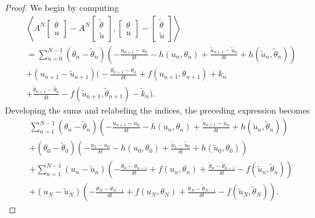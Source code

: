 \documentclass[12pt]{amsart}
\newcommand{\1}{{\chi}}
\newcommand{\lb}{\left(}
\newcommand{\rb}{\right)}
\theoremstyle{definition}
\begin{document}
\begin{proof}
We begin by computing   
\begin{align*}
&\left\langle A^N\left[\begin{array}{c}
\theta\\
u
\end{array}\right]-A^N\left[\begin{array}{c}
\tilde\theta\\
\tilde u
\end{array}\right],\left[\begin{array}{c}
\theta\\
u
\end{array}\right]-\left[\begin{array}{c}
\tilde\theta\\
\tilde u
\end{array}\right]\right\rangle\\
                &=\sum_{n=0}^{N-1} (\theta_n - \tilde \theta_n) \left(-\frac{u_{n+1}- u_{n}}{\delta t} - h(u_{n},\theta_{n}) 
                + \frac{\tilde u_{n+1}-\tilde u_{n}}{\delta t} + h(\tilde u_{n},\tilde \theta_{n}) \right)\\
                &+ (u_{n+1}-\tilde u_{n+1}) \Big( -\frac{\theta_{n+1}-\theta_{n}}{\delta t} + f(u_{n+1},\theta_{n+1}) + k_{n}\\
                &+ \frac{\tilde \theta_{n+1}-\tilde\theta_{n}}{\delta t} - f(\tilde u_{n+1},\tilde \theta_{n+1}) - \tilde k_n \Big).
        \end{align*}
        Developing the sums and relabeling the indices,
        the preceding expression becomes
        \begin{align*}
                &\sum_{n=1}^{N-1} (\theta_n - \tilde \theta_n) \left(-\frac{u_{n+1}- u_{n}}{\delta t} - h(u_{n},\theta_{n}) 
                        + \frac{\tilde u_{n+1}-\tilde u_{n}}{\delta t} + h(\tilde u_{n},\tilde \theta_{n}) \right)\\
                        &+ (\theta_0-\tilde \theta_0) \left(- \frac{u_1-u_0}{\delta t} - h(u_0,\theta_0) + \frac{\tilde u_1 -\tilde u_0}{\delta t} +h(\tilde u_0,\theta_0) \right)\\
            &+\sum_{n=1}^{N-1} (u_n-\tilde u_n) \lb -\frac{\theta_{n}-\theta_{n-1}}{\delta t} + f(u_{n},\theta_{n})
                                + \frac{\tilde \theta_{n}-\tilde\theta_{n-1}}{\delta t} - f(\tilde u_{n},\tilde \theta_{n})   \rb\\
                        &+(u_{N}-\tilde u_{N})\lb-\frac{\theta_N-\theta_{N-1}}{\delta t} +f(u_N,\theta_N) + \frac{\tilde \theta_N-\tilde \theta_{N-1}}{\delta t}- f(\tilde u_N,\tilde \theta_N) \rb.

\end{align*}
\end{proof}
\end{document}
